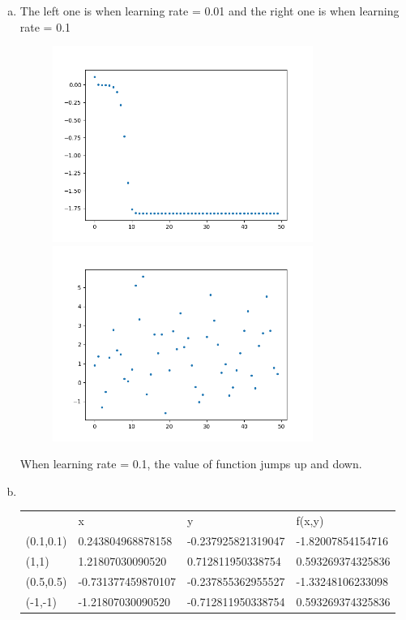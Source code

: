 \documentclass[11pt]{article}
\begin{document}
\begin{enumerate} [(a)]
	\item The left one is when learning rate = 0.01 and the right one is when learning rate = 0.1 
		\begin{figure}[htbp]
		\centering
		\begin{minipage}[t]{0.48\textwidth}
			\centering
			\includegraphics[width=8.5cm]{2_1.png}
		\end{minipage}
		\begin{minipage}[t]{0.48\textwidth}
			\centering
			\includegraphics[width=8.5cm]{2_2.png}
		\end{minipage}
	\end{figure}
	When learning rate = 0.1, the value of function jumps up and down.

	\item \ \\
	\begin{tabular}{|l|l|l|l|}
	\hline
	          & x                  & y                  & f(x,y)            \\
	(0.1,0.1) & 0.243804968878158  & -0.237925821319047 & -1.82007854154716 \\
	(1,1)     & 1.21807030090520   & 0.712811950338754  & 0.593269374325836 \\
	(0.5,0.5) & -0.731377459870107 & -0.237855362955527 & -1.33248106233098 \\
	(-1,-1)   & -1.21807030090520  & -0.712811950338754 & 0.593269374325836
	\end{tabular}
\end{enumerate}
\end{document}
